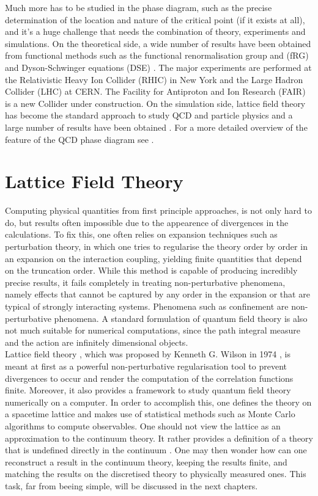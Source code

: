 Much more has to be studied in the phase diagram, such as the precise determination of the location and nature of the critical point (if it exists at all), and it's a huge challenge that needs the combination of theory, experiments and simulations.
On the theoretical side, a wide number of results have been obtained from functional methods such as the functional renormalisation group and (fRG) and Dyson-Schwinger equations (DSE) \cite{QCDphase,QCDphase2,Gao_2021}.
The major experiments are performed at the Relativistic Heavy Ion Collider (RHIC) in New York and the Large Hadron
Collider (LHC) at CERN. The Facility for Antiproton and Ion Research (FAIR) is a new Collider under construction. On the simulation side, lattice field theory has become the standard approach to study QCD and particle physics and a large number of results have been obtained \cite{wuppertal,201915,Endroedi_2014}. 
For a more detailed overview of the feature of the QCD phase diagram see \cite{phasediag1,Bellwied2015}.
\section{Lattice Field Theory}
\vspace{20pt}
Computing physical quantities from first principle approaches, is not only hard to do, but results often impossible due to the appearence of divergences in the calculations. To fix this, one often relies on expansion techniques such as perturbation theory, in which one tries to regularise the theory order by order in an expansion on the interaction coupling, yielding finite quantities that depend on the truncation order.  While this method is capable of producing incredibly precise results, it fails completely in treating non-perturbative phenomena, namely effects that cannot be captured by any order in the expansion or that are typical of strongly interacting systems.
Phenomena such as confinement are non-perturbative phenomena.
A standard formulation of quantum field theory is also not much suitable for numerical computations, since the path integral measure and the action are infinitely dimensional objects. \\
Lattice field theory \cite{Montvay1994QuantumLattice,rothe_LGT,gattringer_LQCD,creutz_2023}, which was proposed by Kenneth G. Wilson in 1974 \cite{wilson_lqcd}, is meant at first as a powerful non-perturbative regularisation tool to prevent divergences to occur and render the computation of the correlation functions finite. Moreover, it also provides a framework to study quantum field theory numerically on a computer. In order to accomplish this, one defines the theory on a spacetime lattice and makes use of statistical methods such as Monte Carlo algorithms to compute observables. 
One should not view the lattice as an approximation to the continuum theory. It rather
provides a definition of a theory that is undefined directly in the continuum \cite{Wiese:2009qsa}. One may then wonder how can one reconstruct a result in the continuum theory, keeping the results finite, and matching the results on the discretised theory to physically measured ones. This task, far from beeing simple, will be  discussed in the next chapters.\

